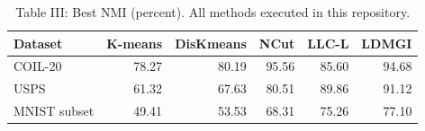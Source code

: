 \begin{table}[ht]
\centering
\caption{Table III: Best NMI (percent). All methods executed in this repository.}
\begin{tabular}{lrrrrr}
\toprule
Dataset & K-means & DisKmeans & NCut & LLC-L & LDMGI \\
\midrule
COIL-20 & 78.27 & 80.19 & 95.56 & 85.60 & 94.68 \\
USPS & 61.32 & 67.63 & 80.51 & 89.86 & 91.12 \\
MNIST subset & 49.41 & 53.53 & 68.31 & 75.26 & 77.10 \\
\bottomrule
\end{tabular}
\end{table}
